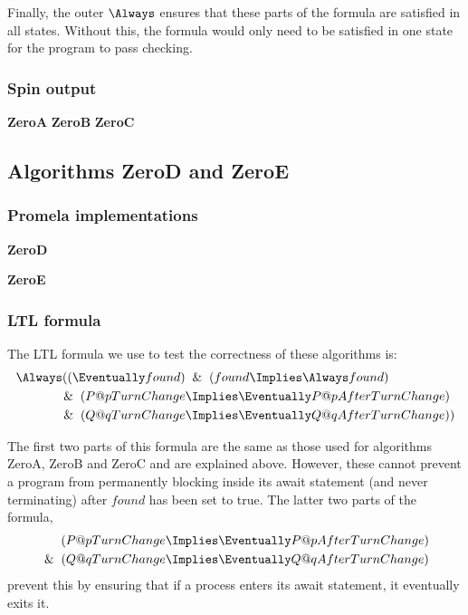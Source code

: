 \documentclass[12pt,a4paper]{scrartcl}
\begin{document}
Finally, the outer \(\Always\) ensures that these parts of the formula are satisfied in all states. Without this, the formula would only need to be satisfied in one state for the program to pass checking.

\subsubsection{Spin output}
\textbf{ZeroA}
\textbf{ZeroB}
\textbf{ZeroC}

\subsection{Algorithms ZeroD and ZeroE}

\subsubsection{Promela implementations}

\textbf{ZeroD}

\textbf{ZeroE}


\subsubsection{LTL formula}

The LTL formula we use to test the correctness of these algorithms is:
\begin{align} 
\Always ( ( \Eventually found ) &\And ( found \Implies \Always found )\notag\\
\And ( P@pTurnChange &\Implies \Eventually P@pAfterTurnChange )\\
\And ( Q@qTurnChange &\Implies \Eventually Q@qAfterTurnChange ) )\notag
\end{align}

The first two parts of this formula are the same as those used for algorithms ZeroA, ZeroB and ZeroC and are explained above. However, these cannot prevent a program from permanently blocking inside its await statement (and never terminating) after $found$ has been set to true. The latter two parts of the formula,
\begin{align} 
( P@pTurnChange &\Implies \Eventually P@pAfterTurnChange )\notag\\
\And ( Q@qTurnChange &\Implies \Eventually Q@qAfterTurnChange ) 
\end{align}
prevent this by ensuring that if a process enters its await statement, it eventually exits it.
\end{document}
